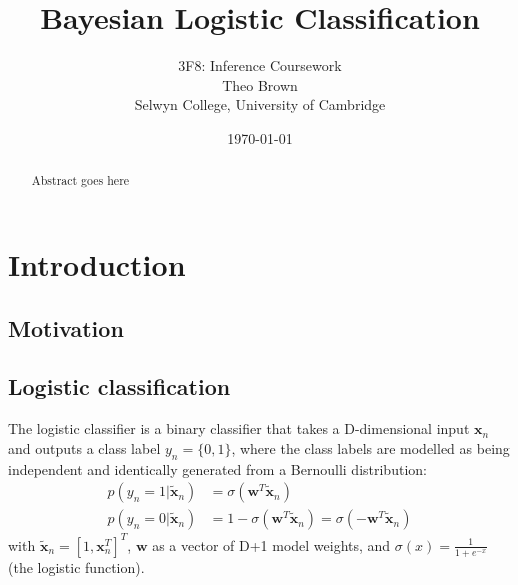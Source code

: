 \documentclass[a4paper]{article}
\begin{document}
    \title{Bayesian Logistic Classification}
    \author{3F8: Inference Coursework \\ Theo Brown \\ Selwyn College, University of Cambridge}
    \date{\today}
    \maketitle

    \begin{abstract}
        Abstract goes here
    \end{abstract}
    
    \section{Introduction}\label{sec:introduction}
    \subsection{Motivation}
    
    \subsection{Logistic classification}
    The logistic classifier is a binary classifier that takes a D-dimensional input $\bm{x}_n$ and outputs a class label $y_n = \{0, 1\}$, where the class labels are modelled as being independent and identically generated from a Bernoulli distribution:
    \begin{align}
        p(y_n = 1 | \tilde{\bm{x}}_n) &= \sigma (\bm{w}^T\tilde{\bm{x}}_n) \nonumber \\
        p(y_n = 0 | \tilde{\bm{x}}_n) &= 1 - \sigma (\bm{w}^T\tilde{\bm{x}}_n) = \sigma (-\bm{w}^T\tilde{\bm{x}}_n)
    \end{align}
    with $\tilde{\bm{x}}_n = \left[1, \bm{x}_n^T \right]^T$, $\bm{w}$ as a vector of D+1 model weights, and $\sigma(x) = \frac{1}{1 + e^{-x}}$ (the logistic function).
\end{document}
